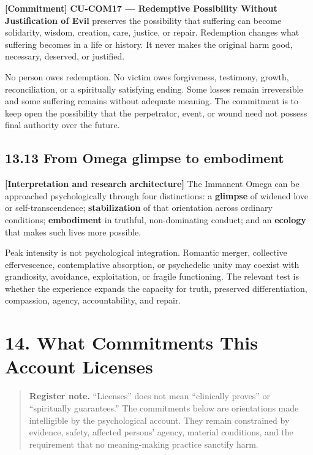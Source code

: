 \documentclass[
  11pt,
]{article}
\begin{document}
\textbf{{[}Commitment{]}} \textbf{CU-COM17 --- Redemptive Possibility
Without Justification of Evil} preserves the possibility that suffering
can become solidarity, wisdom, creation, care, justice, or repair.
Redemption changes what suffering becomes in a life or history. It never
makes the original harm good, necessary, deserved, or justified.

No person owes redemption. No victim owes forgiveness, testimony,
growth, reconciliation, or a spiritually satisfying ending. Some losses
remain irreversible and some suffering remains without adequate meaning.
The commitment is to keep open the possibility that the perpetrator,
event, or wound need not possess final authority over the future.

\subsection{13.13 From Omega glimpse to
embodiment}\label{from-omega-glimpse-to-embodiment}

\textbf{{[}Interpretation and research architecture{]}} The Immanent
Omega can be approached psychologically through four distinctions: a
\textbf{glimpse} of widened love or self-transcendence;
\textbf{stabilization} of that orientation across ordinary conditions;
\textbf{embodiment} in truthful, non-dominating conduct; and an
\textbf{ecology} that makes such lives more possible.

Peak intensity is not psychological integration. Romantic merger,
collective effervescence, contemplative absorption, or psychedelic unity
may coexist with grandiosity, avoidance, exploitation, or fragile
functioning. The relevant test is whether the experience expands the
capacity for truth, preserved differentiation, compassion, agency,
accountability, and repair.

\section{14. What Commitments This Account
Licenses}\label{what-commitments-this-account-licenses}

\begin{quote}
\textbf{Register note.} ``Licenses'' does not mean ``clinically proves''
or ``spiritually guarantees.'' The commitments below are orientations
made intelligible by the psychological account. They remain constrained
by evidence, safety, affected persons' agency, material conditions, and
the requirement that no meaning-making practice sanctify harm.
\end{quote}
\end{document}
